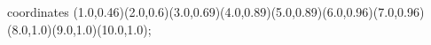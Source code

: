					coordinates { (1.0,0.46)(2.0,0.6)(3.0,0.69)(4.0,0.89)(5.0,0.89)(6.0,0.96)(7.0,0.96)(8.0,1.0)(9.0,1.0)(10.0,1.0)};